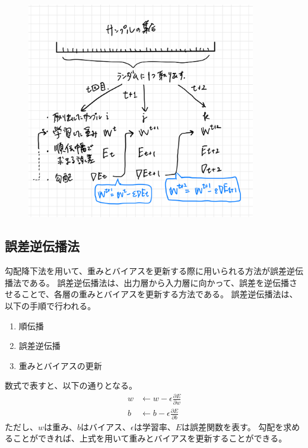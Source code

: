 \documentclass{ltjsarticle}
\begin{document}
\begin{figure}[ht]
  \centering
  \includegraphics[width=10cm]{./capture/confirm_test/day1_08_1.png}
  \caption{}
  \label{fig:day1_08_1}
\end{figure}

\subsection{誤差逆伝播法}
勾配降下法を用いて、重みとバイアスを更新する際に用いられる方法が誤差逆伝播法である。
誤差逆伝播法は、出力層から入力層に向かって、誤差を逆伝播させることで、各層の重みとバイアスを更新する方法である。
誤差逆伝播法は、以下の手順で行われる。
\begin{enumerate}
  \item 順伝播
  \item 誤差逆伝播
  \item 重みとバイアスの更新
\end{enumerate}
数式で表すと、以下の通りとなる。
\begin{align}
  w &\leftarrow w - \epsilon \frac{\partial E}{\partial w} \\
  b &\leftarrow b - \epsilon \frac{\partial E}{\partial b}
\end{align}
ただし、$w$は重み、$b$はバイアス、$\epsilon$は学習率、$E$は誤差関数を表す。
勾配を求めることができれば、上式を用いて重みとバイアスを更新することができる。
\end{document}
